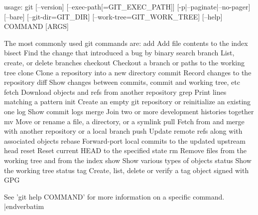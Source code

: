 \verbatim
usage: git [--version] [--exec-path[=GIT_EXEC_PATH]] [-p|--paginate|--no-pager] [--bare] [--git-dir=GIT_DIR] [--work-tree=GIT_WORK_TREE] [--help] COMMAND [ARGS]

The most commonly used git commands are:
   add        Add file contents to the index
   bisect     Find the change that introduced a bug by binary search
   branch     List, create, or delete branches
   checkout   Checkout a branch or paths to the working tree
   clone      Clone a repository into a new directory
   commit     Record changes to the repository
   diff       Show changes between commits, commit and working tree, etc
   fetch      Download objects and refs from another repository
   grep       Print lines matching a pattern
   init       Create an empty git repository or reinitialize an existing one
   log        Show commit logs
   merge      Join two or more development histories together
   mv         Move or rename a file, a directory, or a symlink
   pull       Fetch from and merge with another repository or a local branch
   push       Update remote refs along with associated objects
   rebase     Forward-port local commits to the updated upstream head
   reset      Reset current HEAD to the specified state
   rm         Remove files from the working tree and from the index
   show       Show various types of objects
   status     Show the working tree status
   tag        Create, list, delete or verify a tag object signed with GPG

See 'git help COMMAND' for more information on a specific command.
|endverbatim
